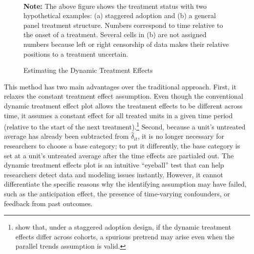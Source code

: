 \documentclass[12pt]{article}
\begin{document}
\begin{figure}[!ht]
\caption{Estimating the Dynamic Treatment Effects}\label{fg:treat}
\centering
\begin{minipage}{1\linewidth}{
\centering
\hspace{0em}
\hspace{1em}
}\\
\footnotesize\textbf{Note:} The above figure shows the treatment status with two hypothetical examples: (a) staggered adoption and (b) a general panel treatment structure. Numbers correspond to time relative to the onset of a treatment. Several cells in (b) are not assigned numbers because left or right censorship of data makes their relative positions to a treatment uncertain.
\end{minipage}\vspace{-0.5em}
\end{figure}

This method has two main advantages over the traditional approach. First, it relaxes the constant treatment effect assumption. Even though the conventional dynamic treatment effect plot allows the treatment effects to be different across time, it assumes a constant effect for all treated units in a given time period (relative to the start of the next treatment).\footnote{\citet{sun2020estimating} show that, under a staggered adoption design, if the dynamic treatment effects differ across cohorts, a spurious pretrend may arise even when the parallel trends assumption is valid.} Second, because a unit's untreated average has already been subtracted from $\hat{\delta}_{it}$, it is no longer necessary for researchers to choose a base category; to put it differently, the base category is set at a unit's untreated average after the time effects are partialed out. The dynamic treatment effects plot is an intuitive ``eyeball'' test that can help researchers detect data and modeling issues instantly. However, it cannot differentiate the specific reasons why the identifying assumption may have failed, such as the anticipation effect, the presence of time-varying confounders, or feedback from past outcomes.
\end{document}
